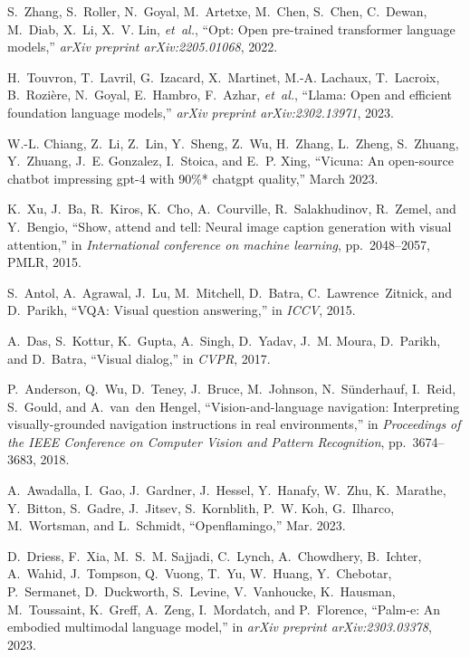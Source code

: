 \begin{thebibliography}{10}
S.~Zhang, S.~Roller, N.~Goyal, M.~Artetxe, M.~Chen, S.~Chen, C.~Dewan, M.~Diab,
  X.~Li, X.~V. Lin, {\em et~al.}, ``Opt: Open pre-trained transformer language
  models,'' {\em arXiv preprint arXiv:2205.01068}, 2022.

H.~Touvron, T.~Lavril, G.~Izacard, X.~Martinet, M.-A. Lachaux, T.~Lacroix,
  B.~Rozi{\`e}re, N.~Goyal, E.~Hambro, F.~Azhar, {\em et~al.}, ``Llama: Open
  and efficient foundation language models,'' {\em arXiv preprint
  arXiv:2302.13971}, 2023.

W.-L. Chiang, Z.~Li, Z.~Lin, Y.~Sheng, Z.~Wu, H.~Zhang, L.~Zheng, S.~Zhuang,
  Y.~Zhuang, J.~E. Gonzalez, I.~Stoica, and E.~P. Xing, ``Vicuna: An
  open-source chatbot impressing gpt-4 with 90\%* chatgpt quality,'' March
  2023.

K.~Xu, J.~Ba, R.~Kiros, K.~Cho, A.~Courville, R.~Salakhudinov, R.~Zemel, and
  Y.~Bengio, ``Show, attend and tell: Neural image caption generation with
  visual attention,'' in {\em International conference on machine learning},
  pp.~2048--2057, PMLR, 2015.

S.~Antol, A.~Agrawal, J.~Lu, M.~Mitchell, D.~Batra, C.~Lawrence~Zitnick, and
  D.~Parikh, ``{VQA}: Visual question answering,'' in {\em ICCV}, 2015.

A.~Das, S.~Kottur, K.~Gupta, A.~Singh, D.~Yadav, J.~M. Moura, D.~Parikh, and
  D.~Batra, ``Visual dialog,'' in {\em CVPR}, 2017.

P.~Anderson, Q.~Wu, D.~Teney, J.~Bruce, M.~Johnson, N.~S{\"u}nderhauf, I.~Reid,
  S.~Gould, and A.~van~den Hengel, ``Vision-and-language navigation:
  Interpreting visually-grounded navigation instructions in real
  environments,'' in {\em Proceedings of the IEEE Conference on Computer Vision
  and Pattern Recognition}, pp.~3674--3683, 2018.

A.~Awadalla, I.~Gao, J.~Gardner, J.~Hessel, Y.~Hanafy, W.~Zhu, K.~Marathe,
  Y.~Bitton, S.~Gadre, J.~Jitsev, S.~Kornblith, P.~W. Koh, G.~Ilharco,
  M.~Wortsman, and L.~Schmidt, ``Openflamingo,'' Mar. 2023.

D.~Driess, F.~Xia, M.~S.~M. Sajjadi, C.~Lynch, A.~Chowdhery, B.~Ichter,
  A.~Wahid, J.~Tompson, Q.~Vuong, T.~Yu, W.~Huang, Y.~Chebotar, P.~Sermanet,
  D.~Duckworth, S.~Levine, V.~Vanhoucke, K.~Hausman, M.~Toussaint, K.~Greff,
  A.~Zeng, I.~Mordatch, and P.~Florence, ``Palm-e: An embodied multimodal
  language model,'' in {\em arXiv preprint arXiv:2303.03378}, 2023.


\end{thebibliography}
